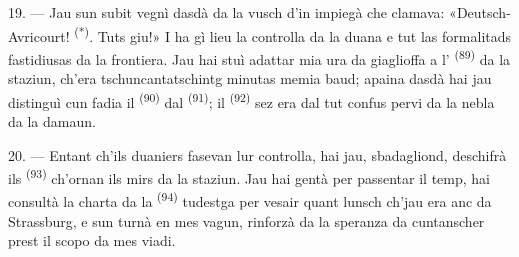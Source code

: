 19. --- Jau sun subit vegnì dasdà da la vusch d'in impiegà che clamava:
«Deutsch-Avricourt! \textsuperscript{(*)}. Tuts giu!» I ha gì lieu la controlla da la
duana e tut las formalitads fastidiusas da la frontiera. Jau hai stuì adattar mia ura
da giaglioffa a l' \textsuperscript{(89)} da la staziun, ch'era
tschuncantatschintg minutas memia baud; apaina dasdà hai jau distinguì cun fadia il
 \textsuperscript{(90)} dal  \textsuperscript{(91)}; il
 \textsuperscript{(92)} sez era dal tut confus pervi da la nebla da la
damaun.

20. --- Entant ch'ils duaniers fasevan lur controlla, hai jau, sbadagliond, deschifrà
ils  \textsuperscript{(93)} ch'ornan ils mirs da la staziun. Jau hai
gentà per passentar il temp, hai consultà la charta da la 
\textsuperscript{(94)} tudestga per vesair quant lunsch ch'jau era anc da Strassburg, e
sun turnà en mes vagun, rinforzà da la speranza da cuntanscher prest il scopo da mes
viadi.

\VUsaut{6.0mm}
\VUfilet{22mm}
